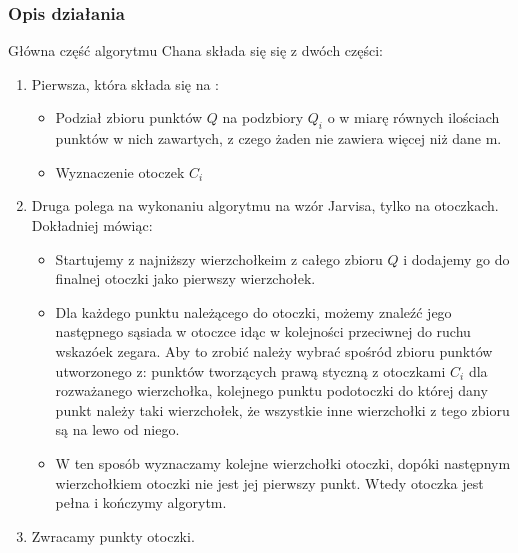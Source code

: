 \documentclass[11pt]{article}
\theoremstyle{remark} \newtheorem{definition}{def.}
\theoremstyle{definition} \newtheorem{twierdzenie}{tw.}
\begin{document}
    \subsubsection{Opis działania}
    Główna część algorytmu Chana składa się  się z dwóch części:
    \begin{enumerate}
        \item   Pierwsza, która składa się  na :
                \begin{itemize}
                    \item   Podział zbioru punktów $Q$ na podzbiory $Q_i$ o w miarę równych
                            ilościach punktów w nich zawartych, z czego żaden nie 
                            zawiera więcej niż dane m. 
                    \item   Wyznaczenie otoczek $C_i$
                \end{itemize}
        \item   Druga polega na wykonaniu algorytmu na wzór Jarvisa, tylko na 
                otoczkach. Dokładniej mówiąc:
                \begin{itemize}
                    \item   Startujemy z najniższy wierzchołkeim z całego zbioru $Q$
                            i dodajemy go do finalnej otoczki jako pierwszy wierzchołek.
                    \item   Dla każdego punktu należącego do otoczki, możemy znaleźć
                            jego następnego sąsiada w otoczce idąc w kolejności przeciwnej
                            do ruchu wskazóek zegara. 
                            Aby to zrobić należy wybrać spośród zbioru punktów utworzonego z:
                            punktów tworzących prawą styczną z otoczkami $C_i$ dla rozważanego
                            wierzchołka, kolejnego punktu podotoczki do której dany punkt należy
                            taki wierzchołek, że wszystkie inne wierzchołki z tego zbioru są
                            na lewo od niego.
                    \item   W ten sposób wyznaczamy kolejne wierzchołki otoczki, dopóki
                            następnym wierzchołkiem otoczki nie jest jej pierwszy punkt.
                            Wtedy otoczka jest pełna i kończymy algorytm.
                \end{itemize}
    
        \item   Zwracamy punkty otoczki. \\
    \end{enumerate}
\end{document}
